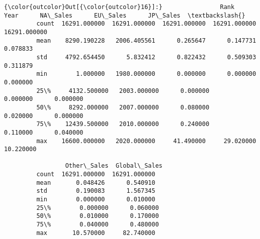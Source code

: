 \documentclass[11pt]{article}
\begin{document}
\begin{Verbatim}[commandchars=\\\{\}]
{\color{outcolor}Out[{\color{outcolor}16}]:}                Rank          Year      NA\_Sales      EU\_Sales      JP\_Sales  \textbackslash{}
         count  16291.000000  16291.000000  16291.000000  16291.000000  16291.000000   
         mean    8290.190228   2006.405561      0.265647      0.147731      0.078833   
         std     4792.654450      5.832412      0.822432      0.509303      0.311879   
         min        1.000000   1980.000000      0.000000      0.000000      0.000000   
         25\%     4132.500000   2003.000000      0.000000      0.000000      0.000000   
         50\%     8292.000000   2007.000000      0.080000      0.020000      0.000000   
         75\%    12439.500000   2010.000000      0.240000      0.110000      0.040000   
         max    16600.000000   2020.000000     41.490000     29.020000     10.220000   
         
                 Other\_Sales  Global\_Sales  
         count  16291.000000  16291.000000  
         mean       0.048426      0.540910  
         std        0.190083      1.567345  
         min        0.000000      0.010000  
         25\%        0.000000      0.060000  
         50\%        0.010000      0.170000  
         75\%        0.040000      0.480000  
         max       10.570000     82.740000  
\end{Verbatim}
            
\end{document}
